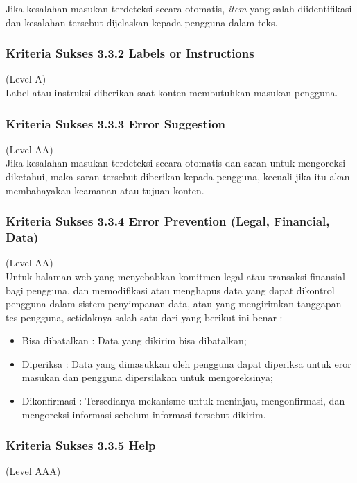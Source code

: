 \documentclass[a4paper,twoside]{article}
\begin{document}
\begin{enumerate}
		Jika kesalahan masukan terdeteksi secara otomatis, \textit{item} yang salah diidentifikasi dan kesalahan tersebut dijelaskan kepada pengguna dalam teks.
		
		\subsubsection*{Kriteria Sukses 3.3.2 Labels or Instructions}
		\label{subsubsec:kriteria_3.3.2}
		(Level A) \\
		
		Label atau instruksi diberikan saat konten membutuhkan masukan pengguna.
		
		\subsubsection*{Kriteria Sukses 3.3.3 Error Suggestion}
		\label{subsubsec:kriteria_3.3.3}
		(Level AA) \\
		
		Jika kesalahan masukan terdeteksi secara otomatis dan saran untuk mengoreksi diketahui, maka saran tersebut diberikan kepada pengguna, kecuali jika itu akan membahayakan keamanan atau tujuan konten.
		
		\subsubsection*{Kriteria Sukses 3.3.4 Error Prevention (Legal, Financial, Data)}
		\label{subsubsec:kriteria_3.3.4}
		(Level AA) \\
		
		Untuk halaman web yang menyebabkan komitmen legal atau transaksi finansial bagi pengguna, dan memodifikasi atau menghapus data yang dapat dikontrol pengguna dalam sistem penyimpanan data, atau yang mengirimkan tanggapan tes pengguna, setidaknya salah satu dari yang berikut ini benar :
		
		\begin{itemize}
			\item Bisa dibatalkan : Data yang dikirim bisa dibatalkan;
			\item Diperiksa : Data yang dimasukkan oleh pengguna dapat diperiksa untuk eror masukan dan pengguna dipersilakan untuk mengoreksinya;
			\item Dikonfirmasi : Tersedianya mekanisme untuk meninjau, mengonfirmasi, dan mengoreksi informasi sebelum informasi tersebut dikirim.
		\end{itemize}
		
		
		\subsubsection*{Kriteria Sukses 3.3.5 Help}
		\label{subsubsec:kriteria_3.3.5}
		(Level AAA) \\
		

\end{enumerate}
\end{document}
